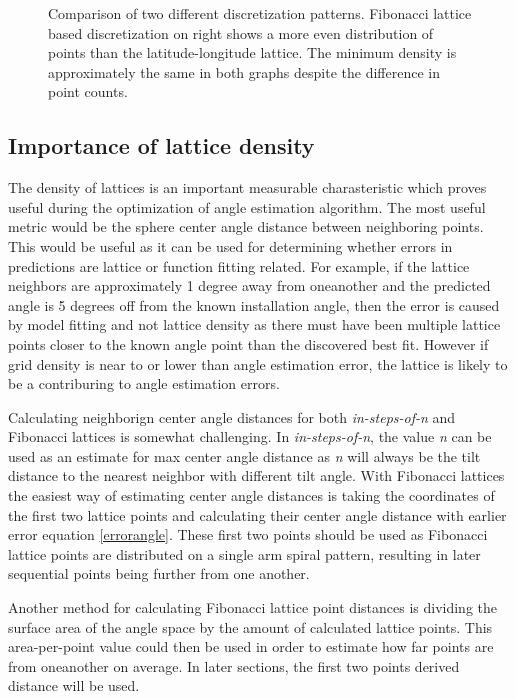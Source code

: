 \begin{figure}
\caption{Comparison of two different discretization patterns. Fibonacci lattice based discretization on right shows a more even distribution of points than the latitude-longitude lattice. The minimum density is approximately the same in both graphs despite the difference in point counts.}
     \label{fig_5stepfibolat}
\end{figure}

\newpage
\subsection{Importance of lattice density}\label{ss_lattice_density}
The density of lattices is an important measurable charasteristic which proves useful during the optimization of angle estimation algorithm. The most useful metric would be the sphere center angle distance between neighboring points. This would be useful as it can be used for determining whether errors in predictions are lattice or function fitting related. For example, if the lattice neighbors are approximately 1 degree away from oneanother and the predicted angle is 5 degrees off from the known installation angle, then the error is caused by model fitting and not lattice density as there must have been multiple lattice points closer to the known angle point than the discovered best fit. However if grid density is near to or lower than angle estimation error, the lattice is likely to be a contriburing to angle estimation errors.

Calculating neighborign center angle distances for both \textit{in-steps-of-n} and Fibonacci lattices is somewhat challenging. In \textit{in-steps-of-n}, the value \textit{n} can be used as an estimate for max center angle distance as \textit{n} will always be the tilt distance to the nearest neighbor with different tilt angle. With Fibonacci lattices the easiest way of estimating center angle distances is taking the coordinates of the first two lattice points and calculating their center angle distance with earlier error equation \ref{errorangle}. These first two points should be used as Fibonacci lattice points are distributed on a single arm spiral pattern, resulting in later sequential points being further from one another.

Another method for calculating Fibonacci lattice point distances is dividing the surface area of the angle space by the amount of calculated lattice points. This area-per-point value could then be used in order to estimate how far points are from oneanother on average. In later sections, the first two points derived distance will be used.

